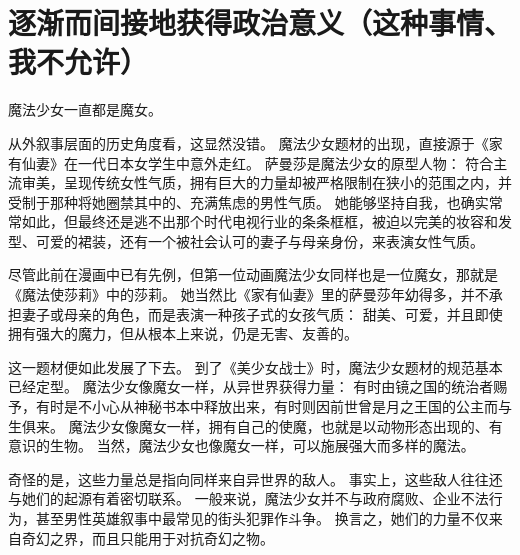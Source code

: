 \chapter[逐渐而间接地获得政治意义（这种事情、我不允许）]{逐渐而间接地获得政治意义\protect\footnotemark（这种事情、我不允许）}


魔法少女一直都是魔女。

从外叙事层面的历史角度看，这显然没错。
魔法少女题材的出现，直接源于《家有仙妻》在一代日本女学生中意外走红\cite{ref48}。
萨曼莎是魔法少女的原型人物：
符合主流审美，呈现传统女性气质，拥有巨大的力量却被严格限制在狭小的范围之内，并受制于那种将她圈禁其中的、充满焦虑的男性气质。
她能够坚持自我，也确实常常如此，但最终还是逃不出那个时代电视行业的条条框框，被迫以完美的妆容和发型、可爱的裙装，还有一个被社会认可的妻子与母亲身份，来表演女性气质\cite{ref49}。

尽管此前在漫画中已有先例，但第一位动画魔法少女同样也是一位魔女，那就是《魔法使莎莉》中的莎莉。
她当然比《家有仙妻》里的萨曼莎年幼得多，并不承担妻子或母亲的角色，而是表演一种孩子式的女孩气质：
甜美、可爱，并且即使拥有强大的魔力，但从根本上来说，仍是无害、友善的\cite{ref50}。

这一题材便如此发展了下去。
到了《美少女战士》时，魔法少女题材的规范基本已经定型。
魔法少女像魔女一样，从异世界获得力量：
有时由镜之国的统治者赐予，有时是不小心从神秘书本中释放出来，有时则因前世曾是月之王国的公主而与生俱来。
魔法少女像魔女一样，拥有自己的使魔，也就是以动物形态出现的、有意识的生物。
当然，魔法少女也像魔女一样，可以施展强大而多样的魔法。

奇怪的是，这些力量总是指向同样来自异世界的敌人。
事实上，这些敌人往往还与她们的起源有着密切联系。
一般来说，魔法少女并不与政府腐败、企业不法行为，甚至男性英雄叙事中最常见的街头犯罪作斗争。
换言之，她们的力量不仅来自奇幻之界，而且只能用于对抗奇幻之物。

